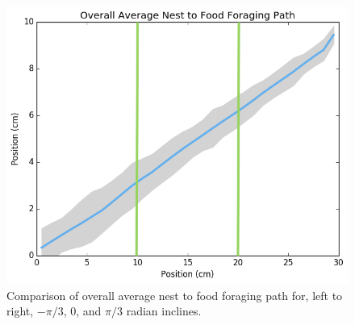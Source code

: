 \begin{figure}[!htb]
\begin{minipage}{0.05\textwidth}
\end{minipage}%
\begin{minipage}{0.33\textwidth}
\includegraphics[width=\textwidth]{img/corner-to-corner-average_path_pidiv3.png}
\end{minipage}%

\caption{Comparison of overall average nest to food foraging path for, left to right, $-\pi/3$, $0$, and $\pi/3$ radian inclines.}
\end{figure}

